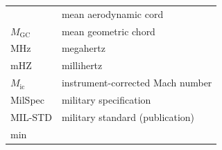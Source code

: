 \documentclass[
]{book}
\begin{document}
\begin{longtable}[]{@{}ll@{}}
\begin{minipage}[t]{0.47\columnwidth}
\end{minipage} & \begin{minipage}[t]{0.47\columnwidth}\raggedright
mean aerodynamic cord\strut
\end{minipage}\tabularnewline
\begin{minipage}[t]{0.47\columnwidth}\raggedright
\(M_{\mathrm{GC}}\)\strut
\end{minipage} & \begin{minipage}[t]{0.47\columnwidth}\raggedright
mean geometric chord\strut
\end{minipage}\tabularnewline
\begin{minipage}[t]{0.47\columnwidth}\raggedright
MHz\strut
\end{minipage} & \begin{minipage}[t]{0.47\columnwidth}\raggedright
megahertz\strut
\end{minipage}\tabularnewline
\begin{minipage}[t]{0.47\columnwidth}\raggedright
mHZ\strut
\end{minipage} & \begin{minipage}[t]{0.47\columnwidth}\raggedright
millihertz\strut
\end{minipage}\tabularnewline
\begin{minipage}[t]{0.47\columnwidth}\raggedright
\(M_{\mathrm{ic}}\)\strut
\end{minipage} & \begin{minipage}[t]{0.47\columnwidth}\raggedright
instrument-corrected Mach number\strut
\end{minipage}\tabularnewline
\begin{minipage}[t]{0.47\columnwidth}\raggedright
MilSpec\strut
\end{minipage} & \begin{minipage}[t]{0.47\columnwidth}\raggedright
military specification\strut
\end{minipage}\tabularnewline
\begin{minipage}[t]{0.47\columnwidth}\raggedright
MIL-STD\strut
\end{minipage} & \begin{minipage}[t]{0.47\columnwidth}\raggedright
military standard (publication)\strut
\end{minipage}\tabularnewline
\begin{minipage}[t]{0.47\columnwidth}\raggedright
min\strut
\end{minipage} & \begin{minipage}[t]{0.47\columnwidth}\raggedright

\end{minipage}
\end{longtable}
\end{document}
